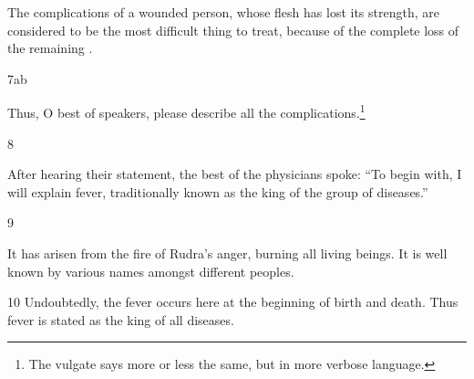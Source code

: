 \begin{translation}
The complications of a wounded person, whose flesh has lost its
strength, are considered to be the most difficult thing to treat, 
because of  the complete loss of the remaining .
    
\item[7ab] 

Thus, O best of speakers, please describe all the 
complications.\footnote{The vulgate says more or less the same, but in more 
verbose language.}
    
\item[8]
    
After hearing their statement, the best of the physicians spoke: “To
begin with, I will explain fever, traditionally known as the king of the group of 
diseases.”


\item[9] 

It has arisen from the fire of Rudra's anger, burning all living
beings. It is well known by various names amongst different peoples.
    

    
    \item[10] Undoubtedly, the fever occurs here at the beginning of birth and
    death. Thus fever is stated as the king of all diseases.
    

\end{translation}
